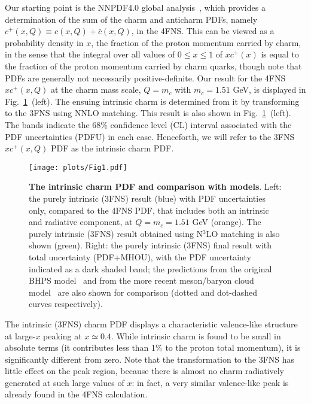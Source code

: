 \documentclass[11pt,a4paper]{article}
\begin{document}
Our starting point is the NNPDF4.0 global
analysis~\cite{Ball:2021leu}, which provides a determination of
the sum of the charm and
anticharm PDFs, namely  $c^+(x,Q)\equiv c(x,Q)+\bar  c(x,Q)$, in the
4FNS. 
This can be viewed 
as a probability density in $x$, the fraction of the proton momentum
carried by charm, in the sense that the integral over all 
values of $0\le x\le1$ of 
$xc^+(x)$ is equal to  the fraction of
the proton momentum carried by charm quarks, though note that PDFs are
generally not necessarily positive-definite. 
%
Our result for  the 4FNS $xc^+(x,Q)$  at
the charm mass scale, $Q=m_c$ with $m_c=1.51$ GeV, 
is displayed in Fig.~\ref{fig:ic/charm_content_3fns}~(left).
%
%
The ensuing intrinsic charm is determined from it
by transforming to the 3FNS using
NNLO matching.
%
This result is also shown 
in Fig.~\ref{fig:ic/charm_content_3fns}~(left).
The bands  indicate the 68\% confidence level (CL) interval
associated with the PDF uncertainties  (PDFU) in each case.  Henceforth, we will refer to
the  3FNS $xc^+(x,Q)$ PDF as the
intrinsic charm PDF. 

\begin{figure}[h]
  \begin{center}
    \texttt{[image: plots/Fig1.pdf]}
    \caption{\small  {\bf The intrinsic charm PDF
      and comparison with models}.
%
      Left: the purely
      intrinsic (3FNS) result (blue)
      with PDF uncertainties only, compared to the 4FNS PDF, that
      includes both an intrinsic and radiative
      component,   at
      $Q=m_c=1.51$ GeV (orange). The purely intrinsic (3FNS)
      result obtained using N$^3$LO matching is also shown (green).
      Right: the purely
      intrinsic (3FNS)
      final result with total uncertainty (PDF+MHOU), with the PDF
      uncertainty indicated as a dark shaded band;
the predictions from the original 
BHPS model~\cite{Brodsky:1980pb} and from the more recent meson/baryon
      cloud model~\cite{Hobbs:2013bia} are also shown for comparison
      (dotted and dot-dashed curves respectively).
         \label{fig:ic/charm_content_3fns} }
\end{center}
\end{figure}

The intrinsic (3FNS) charm PDF
displays a characteristic valence-like
 structure at large-$x$ peaking at $x\simeq 0.4$.
%
 While intrinsic charm is found to be small in absolute terms
 (it contributes less than 1\% to the proton  total momentum),
 it is significantly different from zero.
%
 Note that the transformation to the 3FNS has little effect on the peak region,
 because there is almost no charm radiatively generated at such large values of $x$: in
 fact, a very similar valence-like peak is already found in the 4FNS calculation.
\end{document}
